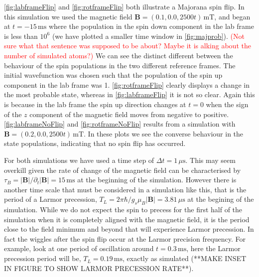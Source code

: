 \autoref{fig:labframeFlip} and \autoref{fig:rotframeFlip} both illustrate a Majorana spin flip.
In this simulation we used the magnetic field $\mathbf{B}=(0.1,0.0,2500t)\,\mathrm{mT}$, and began at $t=-15\,\mathrm{ms}$ where the population in the spin down component in the lab frame is less than $10^{6}$ (we have plotted a smaller time window in \autoref{fig:majprob}). \textcolor{red}{(Not sure what that sentence was supposed to be about? Maybe it is alking about the number of simulated atoms?)}
We can see the distinct different between the behaviour of the spin populations in the two different reference frames.
The initial wavefunction was chosen such that the population of the spin up component in the lab frame was 1.
\autoref{fig:rotframeFlip} clearly displays a change in the most probable state, whereas in \autoref{fig:labframeFlip} it is not so clear.
Again this is because in the lab frame the spin up direction changes at $t=0$ when the sign of the $z$ component of the magnetic field moves from negative to positive.
\autoref{fig:labframeNoFlip} and \autoref{fig:rotframeNoFlip} results from a simulation with $\mathbf{B}=(0.2,0.0,2500t)\,\mathrm{mT}$.
In these plots we see the converse behaviour in the state populations, indicating that no spin flip has occurred.

For both simulations we have used a time step of $\Delta t = 1\,\mu\mathrm{s}$.
This may seem overkill given the rate of change of the magnetic field can be characterised by $\tau_B=\vert\mathbf{B}\vert / \partial_t\vert\mathbf{B}\vert = 15\,\mathrm{ms}$ at the beginning of the simulation.
However there is another time scale that must be considered in a simulation like this, that is the period of a Larmor precession, $T_L = 2\pi\hbar / g_s \mu_B \vert\mathbf{B}\vert = 3.81\,\mu\mathrm{s}$ at the begining of the simulation.
While we do not expect the spin to precess for the first half of the simulation when it is completely aligned with the magnetic field, it is the period close to the field minimum and beyond that will experience Larmor precession.
In fact the wiggles after the spin flip occur at the Larmor precision frequency.
For example, look at one period of oscillation around $t=0.3\,\mathrm{ms}$, here the Larmor precession period will be, $T_L=0.19\,\mathrm{ms}$, exactly as simulated (**MAKE INSET IN FIGURE TO SHOW LARMOR PRECESSION RATE**).


